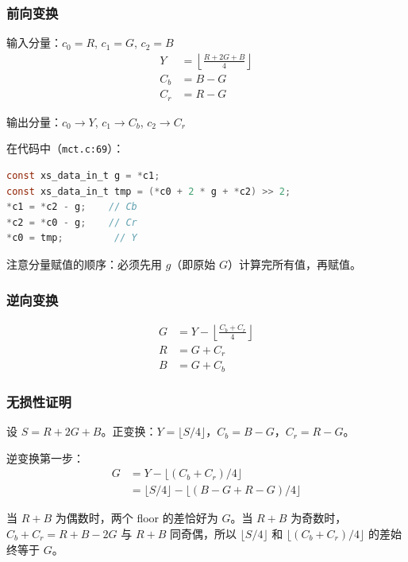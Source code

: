 \subsubsection{前向变换}

输入分量：$c_0 = R$, $c_1 = G$, $c_2 = B$
\begin{align}
Y &= \left\lfloor \frac{R + 2G + B}{4} \right\rfloor \label{eq:rct-y} \\
C_b &= B - G \label{eq:rct-cb} \\
C_r &= R - G \label{eq:rct-cr}
\end{align}

输出分量：$c_0 \to Y$, $c_1 \to C_b$, $c_2 \to C_r$

在代码中（\texttt{mct.c:69}）：

\begin{lstlisting}[language=C,caption={RCT 前向变换——\texttt{mct\_forward\_rct()}}]
const xs_data_in_t g = *c1;
const xs_data_in_t tmp = (*c0 + 2 * g + *c2) >> 2;
*c1 = *c2 - g;    // Cb
*c2 = *c0 - g;    // Cr
*c0 = tmp;         // Y
\end{lstlisting}

注意分量赋值的顺序：必须先用 $g$（即原始 $G$）计算完所有值，再赋值。

\subsubsection{逆向变换}

\begin{align}
G &= Y - \left\lfloor \frac{C_b + C_r}{4} \right\rfloor \\
R &= G + C_r \\
B &= G + C_b
\end{align}

\subsubsection{无损性证明}

设 $S = R + 2G + B$。正变换：$Y = \lfloor S/4 \rfloor$，$C_b = B - G$，$C_r = R - G$。

逆变换第一步：
\begin{align}
G &= Y - \lfloor (C_b + C_r) / 4 \rfloor \\
  &= \lfloor S/4 \rfloor - \lfloor (B - G + R - G) / 4 \rfloor
\end{align}

当 $R + B$ 为偶数时，两个 floor 的差恰好为 $G$。当 $R + B$ 为奇数时，$C_b + C_r = R + B - 2G$ 与 $R + B$ 同奇偶，所以 $\lfloor S/4 \rfloor$ 和 $\lfloor (C_b + C_r)/4 \rfloor$ 的差始终等于 $G$。

